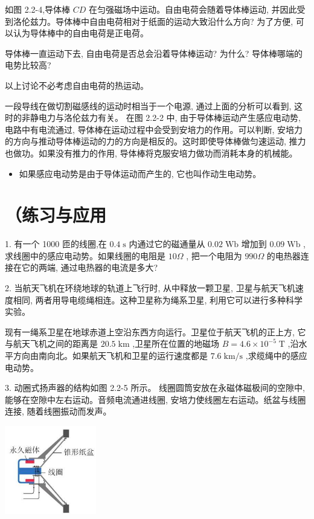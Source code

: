\documentclass[10pt]{article}
\begin{document}
如图 2.2-4,导体棒 \({CD}\) 在匀强磁场中运动。自由电荷会随着导体棒运动, 并因此受到洛伦兹力。导体棒中自由电荷相对于纸面的运动大致沿什么方向? 为了方便, 可以认为导体棒中的自由电荷是正电荷。

导体棒一直运动下去, 自由电荷是否总会沿着导体棒运动? 为什么? 导体棒哪端的电势比较高?

以上讨论不必考虑自由电荷的热运动。

一段导线在做切割磁感线的运动时相当于一个电源, 通过上面的分析可以看到, 这时的非静电力与洛伦兹力有关。 在图 2.2-2 中, 由于导体棒运动产生感应电动势, 电路中有电流通过, 导体棒在运动过程中会受到安培力的作用。可以判断, 安培力的方向与推动导体棒运动的力的方向是相反的。这时即使导体棒做匀速运动, 推力也做功。如果没有推力的作用, 导体棒将克服安培力做功而消耗本身的机械能。

\begin{mdframed}

\begin{itemize}
\item 如果感应电动势是由于导体运动而产生的, 它也叫作动生电动势。
\end{itemize}

\end{mdframed}

\section*{（练习与应用}

1. 有一个 1000 匝的线圈,在 \({0.4}\mathrm{\;s}\) 内通过它的磁通量从 \({0.02}\mathrm{\;{Wb}}\) 增加到 \({0.09}\mathrm{\;{Wb}}\) ,求线圈中的感应电动势。如果线圈的电阻是 \({10\Omega }\) , 把一个电阻为 \({990\Omega }\) 的电热器连接在它的两端, 通过电热器的电流是多大?

2. 当航天飞机在环绕地球的轨道上飞行时, 从中释放一颗卫星, 卫星与航天飞机速度相同, 两者用导电缆绳相连。这种卫星称为绳系卫星, 利用它可以进行多种科学实验。

现有一绳系卫星在地球赤道上空沿东西方向运行。卫星位于航天飞机的正上方, 它与航天飞机之间的距离是 \({20.5}\mathrm{\;{km}}\) ,卫星所在位置的地磁场 \(B = {4.6} \times {10}^{-5}\mathrm{\;T}\) ,沿水平方向由南向北。如果航天飞机和卫星的运行速度都是 \({7.6}\mathrm{\;{km}}/\mathrm{s}\) ,求缆绳中的感应电动势。

3. 动圈式扬声器的结构如图 2.2-5 所示。 线圈圆筒安放在永磁体磁极间的空隙中, 能够在空隙中左右运动。音频电流通进线圈, 安培力使线圈左右运动。纸盆与线圈连接, 随着线圈振动而发声。

\begin{center}
\includegraphics[max width=0.3\textwidth]{images/01910e72-c5b7-7ed5-a6d4-fb3a5faefc32_38_178091.jpg}
\end{center}
\end{document}

